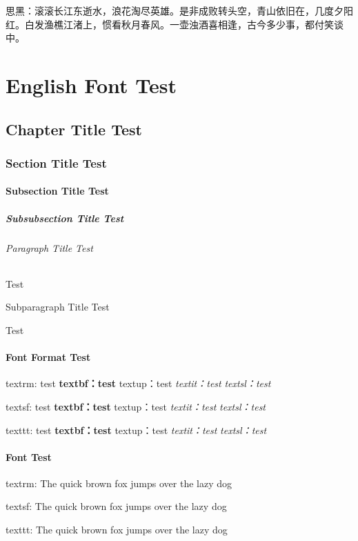 \documentclass{../../PublicResources/DocClass}
\begin{document}
    {\sffamily 思黑：滚滚长江东逝水，浪花淘尽英雄。是非成败转头空，青山依旧在，几度夕阳红。白发渔樵江渚上，惯看秋月春风。一壶浊酒喜相逢，古今多少事，都付笑谈中。}

    \part{English Font Test}
    \chapter{Chapter Title Test}
    \section{Section Title Test}
    \subsection{Subsection Title Test}
    \subsubsection{Subsubsection Title Test}
    \paragraph{Paragraph Title Test}
    Test
    \subparagraph{Subparagraph Title Test}
    Test

    \subsection{Font Format Test}
    {\rmfamily textrm: test \textbf{textbf：test} \textup{textup：test} \textit{textit：test} \textsl{textsl：test}}

    {\sffamily textsf: test \textbf{textbf：test} \textup{textup：test} \textit{textit：test} \textsl{textsl：test}}

    {\ttfamily texttt: test \textbf{textbf：test} \textup{textup：test} \textit{textit：test} \textsl{textsl：test}}

    \subsection{Font Test}
    {\rmfamily textrm: The quick brown fox jumps over the lazy dog}

    {\sffamily textsf: The quick brown fox jumps over the lazy dog}

    {\ttfamily texttt: The quick brown fox jumps over the lazy dog}
\end{document}
